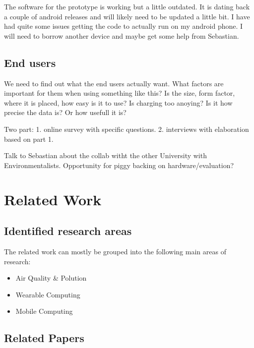 \documentclass{ituthesis}
\begin{document}
The software for the prototype is working but a little outdated. It is dating back a couple of android releases and will likely need to be updated a little bit. I have had quite some issues getting the code to actually run on my android phone. I will need to borrow another device and maybe get some help from Sebastian.

\section{End users}
We need to find out what the end users actually want. What factors are important for them when using something like this? Is the size, form factor, where it is placed, how easy is it to use? Is charging too anoying? Is it how precise the data is? Or how usefull it is?

Two part: 1. online survey with specific questions. 2. interviews with elaboration based on part 1.

Talk to Sebastian about the collab witht the other University with Environmentalists. Opportunity for piggy backing on hardware/evaluation?

\chapter{Related Work}
\label{ch:related_work}

\section{Identified research areas}

The related work can mostly be grouped into the following main areas of research:

\begin{itemize}
	\item Air Quality \& Polution
	\item Wearable Computing
	\item Mobile Computing
\end{itemize}

\section{Related Papers}

%
%
\end{document}

